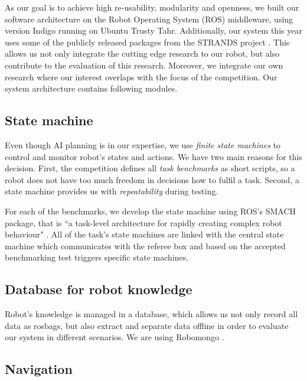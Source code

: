 As our goal is to achieve high re-usability, modularity and openness, we built our software architecture on the Robot Operating System (ROS) middleware, using version Indigo \cite{ros} running on Ubuntu Trusty Tahr. 
Additionally, our system this year uses some of the publicly released packages from the STRANDS project \cite{strands}. 
This allows us not only integrate the cutting edge research to our robot, but also contribute to the evaluation of this research. 
Moreover, we integrate our own research where our interest overlaps with the focus of the competition.
Our system architecture contains following modules.

\subsection{State machine}

Even though AI planning is in our expertise, we use \textit{finite state machines} to control and monitor robot's states and actions. 
We have two main reasons for this decision. First, the competition defines all \textit{task benchmarks} as short scripts, so a robot does not have too much freedom in decisions how to fulfil a task. Second, a state machine provides us with \textit{repeatability} during testing.

For each of the benchmarks, we develop the state machine using ROS's SMACH package, that is ``a task-level architecture for rapidly creating complex robot behaviour" \cite{smach}. 
All of the task's state machines are linked with the central state machine which communicates with the referee box and based on the accepted benchmarking test triggers specific state machines. 


\subsection{Database for robot knowledge}

Robot's knowledge is managed in a database, which allows us not only record all data as rosbags, but also extract and separate data offline in order to evaluate our system in different scenarios. 
We are using Robomongo \cite{robomongo}.

\subsection{Navigation}

